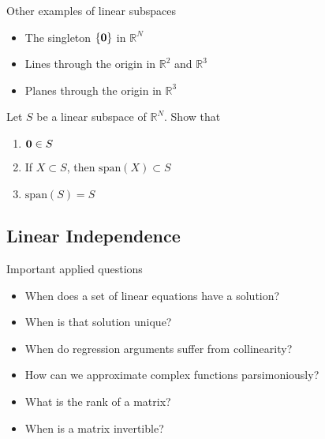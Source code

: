 \documentclass[letterpaper,10pt,english]{jupyterBook}
\begin{document}
\sphinxAtStartPar
Other examples of linear subspaces
\begin{itemize}
\item {} 
\sphinxAtStartPar
The singleton \(\{{\bf 0}\}\) in \(\mathbb{R}^N\)

\item {} 
\sphinxAtStartPar
Lines through the origin in \(\mathbb{R}^2\) and \(\mathbb{R}^3\)

\item {} 
\sphinxAtStartPar
Planes through the origin in \(\mathbb{R}^3\)

\end{itemize}

\sphinxAtStartPar
{} Let \(S\) be a linear subspace of \(\mathbb{R}^N\). Show that
\begin{enumerate}
%
\item {} 
\sphinxAtStartPar
\({\bf 0} \in S\)

\item {} 
\sphinxAtStartPar
If \(X \subset S\), then \(\mathrm{span}(X) \subset S\)

\item {} 
\sphinxAtStartPar
\(\mathrm{span}(S) = S\)

\end{enumerate}


\subsection{Linear Independence}
\label{\detokenize{05.linear_algebra:linear-independence}}
\sphinxAtStartPar
Important applied questions
\begin{itemize}
\item {} 
\sphinxAtStartPar
When does a set of linear equations have a solution?

\item {} 
\sphinxAtStartPar
When is that solution unique?

\item {} 
\sphinxAtStartPar
When do regression arguments suffer from collinearity?

\item {} 
\sphinxAtStartPar
How can we approximate complex functions parsimoniously?

\item {} 
\sphinxAtStartPar
What is the rank of a matrix?

\item {} 
\sphinxAtStartPar
When is a matrix invertible?

\end{itemize}
\end{document}
